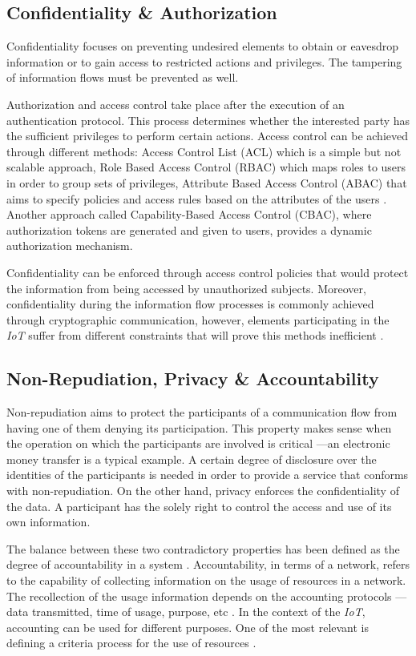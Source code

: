 \documentclass[journal]{IEEEtran}
\begin{document}
  \subsection{Confidentiality \& Authorization}
  Confidentiality focuses on preventing undesired elements to obtain or eavesdrop information or to gain access to restricted actions and privileges. The tampering of information flows must be prevented as well.

  Authorization and access control take place after the execution of an authentication protocol. This process determines whether the interested party has the sufficient privileges to perform certain actions. Access control can be achieved through different methods: Access Control List (ACL) which is a simple but not scalable approach, Role Based Access Control (RBAC) which maps roles to users in order to group sets of privileges, Attribute Based Access Control (ABAC) that aims to specify policies and access rules based on the attributes of the users  \cite{Anggorojati2014}. Another approach called Capability-Based Access Control (CBAC), where authorization tokens are generated and given to users, provides a dynamic authorization mechanism.

  Confidentiality can be enforced through access control policies that would protect the information from being accessed by unauthorized subjects. Moreover, confidentiality during the information flow processes is commonly achieved through cryptographic communication, however, elements participating in the \emph{IoT} suffer from different constraints that will prove this methods inefficient \cite{Baldini2012}.    

  \subsection{Non-Repudiation, Privacy \& Accountability}
  Non-repudiation aims to protect the participants of a communication flow from having one of them denying its participation. This property makes sense when the operation on which the participants are involved is critical ---an electronic money transfer is a typical example. A certain degree of disclosure over the identities of the participants is needed in order to provide a service that conforms with non-repudiation. On the other hand, privacy enforces the confidentiality of the data. A participant has the solely right to control the access and use of its own information.

  The balance between these two contradictory properties has been defined as the degree of accountability in a system \cite{Bassi2013}. Accountability, in terms of a network, refers to the capability of collecting information on the usage of resources in a network. The recollection of the usage information depends on the accounting protocols ---data transmitted, time of usage, purpose, etc  \cite{Sklavos2007}. In the context of the \emph{IoT}, accounting can be used for different purposes. One of the most relevant is defining a criteria process for the use of resources \cite{Bauge2010}.
\end{document}
